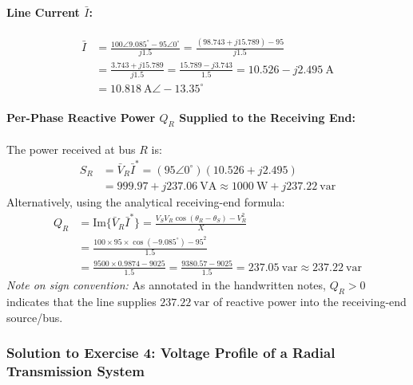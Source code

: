 \paragraph{Line Current $\bar{I}$:}
\begin{align}
    \bar{I} &= \frac{100\angle 9.085^\circ - 95\angle 0^\circ}{j 1.5} = \frac{(98.743 + j15.789) - 95}{j 1.5} \nonumber\\
            &= \frac{3.743 + j15.789}{j 1.5} = \frac{15.789 - j3.743}{1.5} = 10.526 - j2.495\ \text{A} \nonumber\\
            &= \boxed{10.818\ \text{A} \angle -13.35^\circ}
\end{align}

\paragraph{Per-Phase Reactive Power $Q_R$ Supplied to the Receiving End:}
The power received at bus $R$ is:
\begin{align}
    S_R &= \bar{V}_R \bar{I}^* = (95\angle 0^\circ)(10.526 + j2.495) \nonumber\\
        &= 999.97 + j237.06\ \text{VA} \approx 1000\ \text{W} + j 237.22\ \text{var}
\end{align}
Alternatively, using the analytical receiving-end formula:
\begin{align}
    Q_R &= \text{Im}\{\bar{V}_R \bar{I}^*\} = \frac{V_S V_R \cos(\theta_R - \theta_S) - V_R^2}{X} \nonumber\\
        &= \frac{100 \times 95 \times \cos(-9.085^\circ) - 95^2}{1.5} \nonumber\\
        &= \frac{9500 \times 0.9874 - 9025}{1.5} = \frac{9380.57 - 9025}{1.5} = \boxed{237.05\ \text{var} \approx 237.22\ \text{var}}
\end{align}
\textit{Note on sign convention:} As annotated in the handwritten notes, $Q_R > 0$ indicates that the line supplies $237.22\ \text{var}$ of reactive power into the receiving-end source/bus.

\subsubsection*{Solution to Exercise 4: Voltage Profile of a Radial Transmission System}
